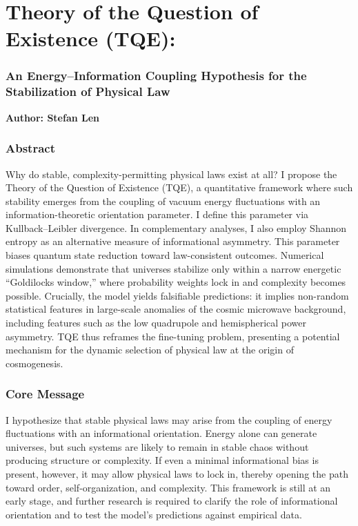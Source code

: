 \section{\texorpdfstring{\textbf{Theory of the Question of Existence
(TQE):}}{Theory of the Question of Existence (TQE):}}\label{theory-of-the-question-of-existence-tqe}

\subsubsection{An Energy--Information Coupling Hypothesis for the
Stabilization of Physical
Law}\label{an-energyinformation-coupling-hypothesis-for-the-stabilization-of-physical-law}

\textbf{Author: Stefan Len}

\subsubsection{\texorpdfstring{\textbf{Abstract}}{Abstract}}\label{abstract}

Why do stable, complexity-permitting physical laws exist at all? I
propose the Theory of the Question of Existence (TQE), a quantitative
framework where such stability emerges from the coupling of vacuum
energy fluctuations with an information-theoretic orientation parameter.
I define this parameter via Kullback--Leibler divergence. In
complementary analyses, I also employ Shannon entropy as an alternative
measure of informational asymmetry. This parameter biases quantum state
reduction toward law-consistent outcomes. Numerical simulations
demonstrate that universes stabilize only within a narrow energetic
``Goldilocks window,'' where probability weights lock in and complexity
becomes possible. Crucially, the model yields falsifiable predictions:
it implies non-random statistical features in large-scale anomalies of
the cosmic microwave background, including features such as the low
quadrupole and hemispherical power asymmetry. TQE thus reframes the
fine-tuning problem, presenting a potential mechanism for the dynamic
selection of physical law at the origin of cosmogenesis.

\subsubsection{\texorpdfstring{\textbf{Core
Message}}{Core Message}}\label{core-message}

I hypothesize that stable physical laws may arise from the coupling of
energy fluctuations with an informational orientation. Energy alone can
generate universes, but such systems are likely to remain in stable
chaos without producing structure or complexity. If even a minimal
informational bias is present, however, it may allow physical laws to
lock in, thereby opening the path toward order, self-organization, and
complexity. This framework is still at an early stage, and further
research is required to clarify the role of informational orientation
and to test the model's predictions against empirical data.

